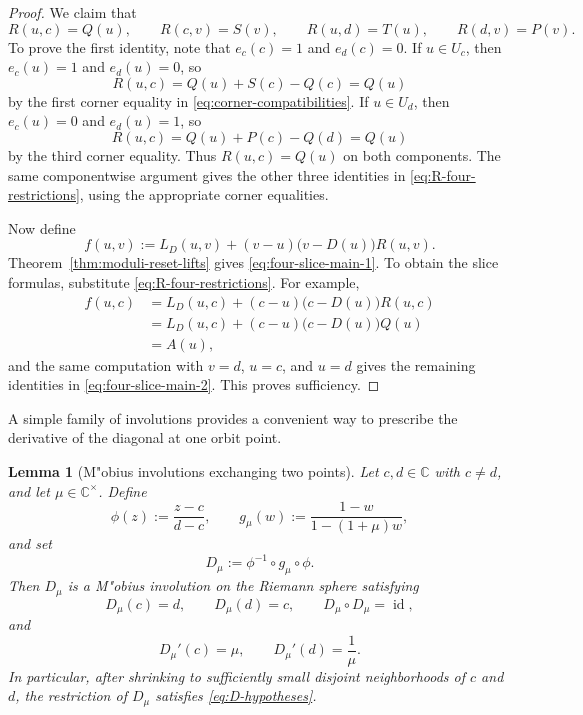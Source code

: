 \documentclass[11pt]{amsart}
\numberwithin{equation}{section}
\newtheorem{lemma}[theorem]{Lemma}
\theoremstyle{remark}
\theoremstyle{definition}
\newcommand{\C}{\mathbb{C}}
\newcommand{\id}{\operatorname{id}}
\begin{document}
\begin{proof}
We claim that
\begin{equation}\label{eq:R-four-restrictions}
R(u,c)=Q(u),\qquad R(c,v)=S(v),\qquad R(u,d)=T(u),\qquad R(d,v)=P(v).
\end{equation}
To prove the first identity, note that $e_c(c)=1$ and $e_d(c)=0$. If $u\in U_c$, then $e_c(u)=1$ and $e_d(u)=0$, so
\[
R(u,c)=Q(u)+S(c)-Q(c)=Q(u)
\]
by the first corner equality in \eqref{eq:corner-compatibilities}. If $u\in U_d$, then $e_c(u)=0$ and $e_d(u)=1$, so
\[
R(u,c)=Q(u)+P(c)-Q(d)=Q(u)
\]
by the third corner equality. Thus $R(u,c)=Q(u)$ on both components. The same componentwise argument gives the other three identities in \eqref{eq:R-four-restrictions}, using the appropriate corner equalities.

Now define
\[
f(u,v):=L_D(u,v)+(v-u)\bigl(v-D(u)\bigr)R(u,v).
\]
Theorem~\ref{thm:moduli-reset-lifts} gives \eqref{eq:four-slice-main-1}. To obtain the slice formulas, substitute \eqref{eq:R-four-restrictions}. For example,
\begin{align*}
f(u,c)
&=L_D(u,c)+(c-u)\bigl(c-D(u)\bigr)R(u,c) \\
&=L_D(u,c)+(c-u)\bigl(c-D(u)\bigr)Q(u) \\
&=A(u),
\end{align*}
and the same computation with $v=d$, $u=c$, and $u=d$ gives the remaining identities in \eqref{eq:four-slice-main-2}. This proves sufficiency.
\end{proof}

A simple family of involutions provides a convenient way to prescribe the derivative of the diagonal at one orbit point.

\begin{lemma}[M"obius involutions exchanging two points]\label{lem:mobius-involution}
Let $c,d\in\C$ with $c\neq d$, and let $\mu\in\C^\times$. Define
\[
\phi(z):=\frac{z-c}{d-c},\qquad g_\mu(w):=\frac{1-w}{1-(1+\mu)w},
\]
and set
\begin{equation}\label{eq:Dmu-def}
D_\mu:=\phi^{-1}\circ g_\mu\circ \phi.
\end{equation}
Then $D_\mu$ is a M"obius involution on the Riemann sphere satisfying
\[
D_\mu(c)=d,\qquad D_\mu(d)=c,\qquad D_\mu\circ D_\mu=\id,
\]
and
\[
D_\mu'(c)=\mu,\qquad D_\mu'(d)=\frac{1}{\mu}.
\]
In particular, after shrinking to sufficiently small disjoint neighborhoods of $c$ and $d$, the restriction of $D_\mu$ satisfies \eqref{eq:D-hypotheses}.
\end{lemma}
\end{document}
